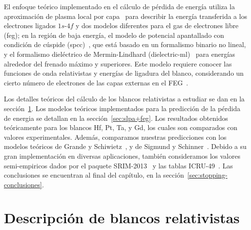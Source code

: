 El enfoque teórico implementado en el cálculo de pérdida de energía 
utiliza la aproximación de plasma local por capa~\cite{mon13} 
para describir la energía transferida a los electrones ligados $1s$-$4f$ 
y dos modelos diferentes para el gas de electrones libre (\acs{feg}); 
en la región de baja energía, el modelo de potencial apantallado con 
condición de cúspide (\acs{spcc})~\cite{mon17}, que está basado en un 
formalismo binario no lineal, y el formalismo dieléctrico de 
Mermin-Lindhard (\acs{dielectric-ml})~\cite{Mermin} para energías 
alrededor del frenado máximo y superiores. Este modelo requiere conocer
las funciones de onda relativistas y energías de ligadura del blanco, 
considerando un cierto número de electrones de las capas externas en el 
FEG~\cite{mendez2019}. %

Los detalles teóricos del cálculo de los blancos relativistas a estudiar 
se dan en la sección~\ref{sec:blancos-relat}. Los modelos teóricos 
implementados para la predicción de la pérdida de energia se detallan 
en la sección~\ref{sec:slpa+feg}. Los resultados obtenidos teóricamente 
para los blancos Hf, Pt, Ta, y Gd, los cuales son comparados con valores 
experimentales. Además, comparamos nuestras predicciones con los 
modelos teóricos de Grande y Schiwietz~\cite{Grande,casp52}, y de 
Sigmund y Schinner~\cite{DPASS20}. Debido a su gran implementación en 
diversas aplicaciones, también consideramos los valores semi-empiricos 
dados por el paquete SRIM-2013~\cite{Ziegler01} y las tablas 
ICRU-49~\cite{ICRU49}. Las conclusiones se encuentran al final del capítulo,
en la sección~\ref{sec:stopping-conclusiones}.

\section{Descripción de blancos relativistas}
\label{sec:blancos-relat}

